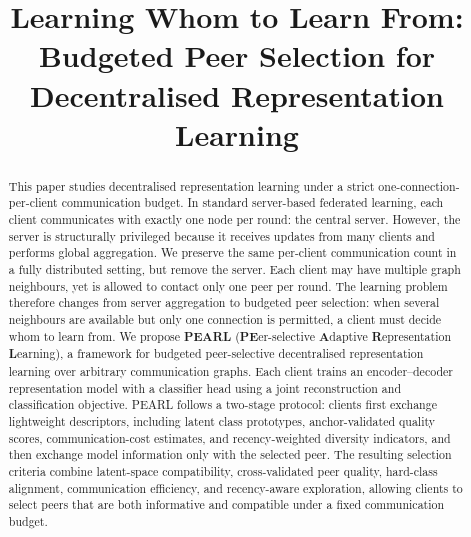 \documentclass[conference]{IEEEtran}
\begin{document}
\title{Learning Whom to Learn From: Budgeted Peer Selection for Decentralised Representation Learning}

\author{
}

\maketitle

\begin{abstract}
This paper studies decentralised representation learning under a strict one-connection-per-client communication budget. In standard server-based federated learning, each client communicates with exactly one node per round: the central server. However, the server is structurally privileged because it receives updates from many clients and performs global aggregation. We preserve the same per-client communication count in a fully distributed setting, but remove the server. Each client may have multiple graph neighbours, yet is allowed to contact only one peer per round. The learning problem therefore changes from server aggregation to budgeted peer selection: when several neighbours are available but only one connection is permitted, a client must decide whom to learn from.
We propose \textbf{PEARL} (\textbf{PE}er-selective \textbf{A}daptive \textbf{R}epresentation \textbf{L}earning), a framework for budgeted peer-selective decentralised representation learning over arbitrary communication graphs. Each client trains an encoder--decoder representation model with a classifier head using a joint reconstruction and classification objective. PEARL follows a two-stage protocol: clients first exchange lightweight descriptors, including latent class prototypes, anchor-validated quality scores, communication-cost estimates, and recency-weighted diversity indicators, and then exchange model information only with the selected peer. The resulting selection criteria combine latent-space compatibility, cross-validated peer quality, hard-class alignment, communication efficiency, and recency-aware exploration, allowing clients to select peers that are both informative and compatible under a fixed communication budget.

\end{abstract}
\end{document}
